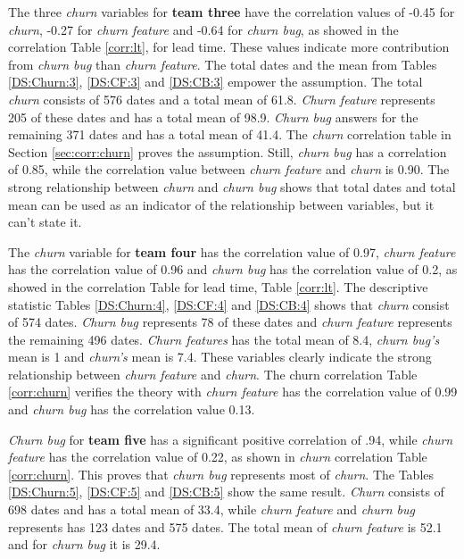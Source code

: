 \documentclass[UKenglish]{ifimaster}  %
\begin{document}
The three \textit{churn} variables for \textbf{team three} have the correlation values of -0.45 for \textit{churn}, -0.27 for \textit{churn feature} and -0.64 for \textit{churn bug}, as showed in the correlation Table \ref{corr:lt}, for lead time. These values indicate more contribution from \textit{churn bug}  than \textit{churn feature}. The total dates and the mean from Tables \ref{DS:Churn:3}, \ref{DS:CF:3} and \ref{DS:CB:3} empower the assumption. The total \textit{churn} consists of 576 dates and a total mean of 61.8. \textit{Churn feature}  represents 205 of these dates and has a total mean of 98.9. \textit{Churn bug} answers for the remaining 371 dates and has a total mean of 41.4. The \textit{churn} correlation table in Section \ref{sec:corr:churn} proves the assumption. Still,  \textit{churn bug} has a correlation of 0.85, while the correlation value between \textit{churn feature} and \textit{churn} is 0.90. The strong relationship between \textit{churn} and \textit{churn bug} shows that total dates and total mean can be used as an indicator of the relationship between variables, but it can't state it.


The \textit{churn} variable for \textbf{team four} has the correlation value of 0.97, \textit{churn feature} has the correlation value of 0.96 and  \textit{churn bug} has the correlation value of 0.2, as showed in the correlation Table for lead time, Table \ref{corr:lt}. The descriptive statistic Tables \ref{DS:Churn:4}, \ref{DS:CF:4} and \ref{DS:CB:4} shows that \textit{churn} consist of 574 dates. \textit{Churn bug} represents 78 of these dates and \textit{churn feature} represents the remaining 496 dates. \textit{Churn features} has the total mean of 8.4, \textit{churn bug's} mean is 1 and \textit{churn's} mean is 7.4. These variables clearly indicate the strong relationship between \textit{churn feature} and \textit{churn}. The churn correlation Table \ref{corr:churn} verifies the theory with \textit{churn feature} has the correlation value of 0.99 and \textit{churn bug} has the correlation value 0.13.

\textit{Churn bug} for \textbf{team five} has a significant positive correlation of .94, while \textit{churn feature} has the correlation value of 0.22, as shown in \textit{churn} correlation Table \ref{corr:churn}. This proves that \textit{churn bug} represents most of \textit{churn}. The Tables \ref{DS:Churn:5}, \ref{DS:CF:5} and \ref{DS:CB:5} show the same result. \textit{Churn} consists of 698 dates and has a total mean of 33.4, while \textit{churn feature} and \textit{churn bug} represents has 123 dates and 575 dates. The total mean of \textit{churn feature} is 52.1 and for \textit{churn bug} it is 29.4. 
\end{document}
